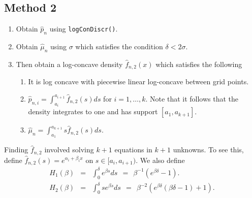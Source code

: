\documentclass[12pt]{article} %
\newcommand{\comH}[1]{{\noindent \color{blue}#1}}
\begin{document}
\subsection{Method 2}

\begin{enumerate}
    \item Obtain $\widehat p_n$ using \texttt{logConDiscr()}.   %
    \item Obtain $\widehat \mu_n$ using $\sigma$ which satisfies the condition $\delta <  2 \sigma$.
    \item  Then obtain a log-concave density $\widehat f_{n,2}(x)$ which satisfies the following
\begin{enumerate}
\item It is log concave with piecewise linear log-concave between grid points.
\item $\widehat p_{n,i}=\int_{a_i}^{a_{i+1}} \widehat f_{n,2}(s)ds$ for $i=1, \ldots, k.$  Note that it follows that the density integrates to one and has support $[a_1, a_{k+1}].$
\item $\widehat \mu_n = \int_{a_1}^{a_{k+1}} s\widehat f_{n,2}(s)ds.$
\end{enumerate}
\end{enumerate}
\noindent Finding $\widehat f_{n,2}$ involved solving $k+1$ equations in $k+1$ unknowns.   To see this, define $\widehat f_{n,2}(s)=e^{\alpha_i + \beta_i x}$ on $s\in [a_i, a_{i+1}).$   %
We also define
\begin{eqnarray*}
H_1(\beta)&=& \int_0^\delta e^{\beta s}ds \ \ = \ \ \beta^{-1}(e^{\beta \delta}-1).\\
H_2(\beta)&=& \int_0^\delta s e^{\beta s}ds\ \ = \ \ \beta^{-2}(e^{\beta \delta}(\beta\delta-1)+1).\\
\end{eqnarray*}

\end{document}
